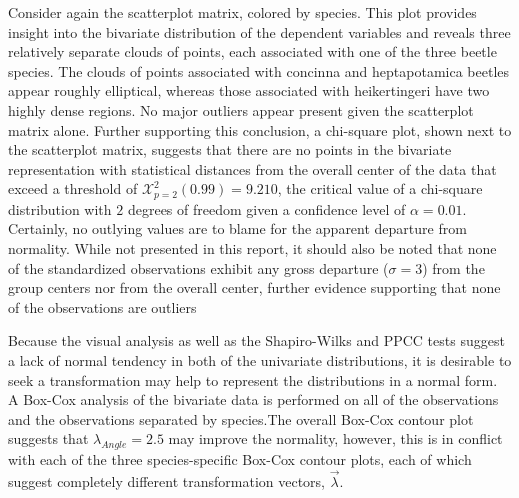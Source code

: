 	Consider again the scatterplot matrix, colored by species. This plot provides insight into the bivariate distribution of the dependent variables and reveals three relatively separate clouds of points, each associated with one of the three beetle species. The clouds of points associated with concinna and heptapotamica beetles appear roughly elliptical, whereas those associated with heikertingeri have two highly dense regions. No major outliers appear present given the scatterplot matrix alone. Further supporting this conclusion, a chi-square plot, shown next to the scatterplot matrix, suggests that there are no points in the bivariate representation with statistical distances from the overall center of the data that exceed a threshold of $\mathcal{X}_{p=2}^{2}(0.99) = 9.210$, the critical value of a chi-square distribution with $2$ degrees of freedom given a confidence level of $\alpha =0.01$. Certainly, no outlying values are to blame for the apparent departure from normality. While not presented in this report, it should also be noted that none of the standardized observations exhibit any gross departure ($\sigma = 3$) from the group centers nor from the overall center, further evidence supporting that none of the observations are outliers

	Because the visual analysis as well as the Shapiro-Wilks and PPCC tests suggest a lack of normal tendency in both of the univariate distributions, it is desirable to seek a transformation may help to represent the distributions in a normal form. A Box-Cox analysis of the bivariate data is performed on all of the observations and the observations separated by species.The overall Box-Cox contour plot suggests that $\lambda_{Angle} = 2.5$ may improve the normality, however, this is in conflict with each of the three species-specific Box-Cox contour plots, each of which suggest completely different transformation vectors, $\vec{\lambda}$. 


